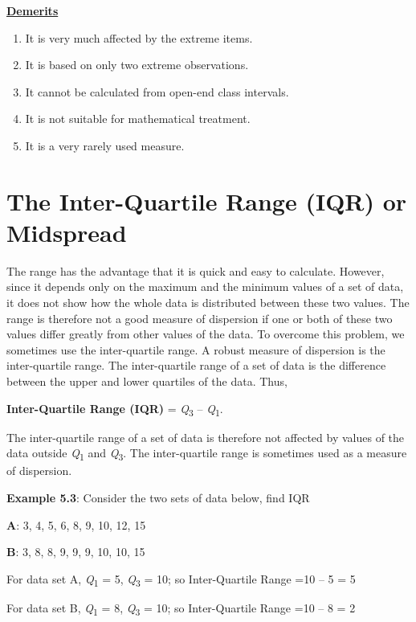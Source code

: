 \documentclass[
]{book}
\begin{document}
\textbf{\underline{Demerits}}

\begin{enumerate}
\def\labelenumi{\arabic{enumi}.}
\item
  It is very much affected by the extreme items.
\item
  It is based on only two extreme observations.
\item
  It cannot be calculated from open-end class intervals.
\item
  It is not suitable for mathematical treatment.
\item
  It is a very rarely used measure.
\end{enumerate}

\hypertarget{the-inter-quartile-range-iqr-or-midspread}{%
\section{The Inter-Quartile Range (IQR) or Midspread}\label{the-inter-quartile-range-iqr-or-midspread}}

The range has the advantage that it is quick and easy to calculate.
However, since it depends only on the maximum and the minimum values of
a set of data, it does not show how the whole data is distributed
between these two values. The range is therefore not a good measure of
dispersion if one or both of these two values differ greatly from other
values of the data. To overcome this problem, we sometimes use the
inter-quartile range. A robust measure of dispersion is the
inter-quartile range. The inter-quartile range of a set of data is the
difference between the upper and lower quartiles of the data. Thus,

\textbf{Inter-Quartile Range (IQR)} = \emph{Q}\textsubscript{3} -- \emph{Q}\textsubscript{1}.

The inter-quartile range of a set of data is therefore not affected by
values of the data outside \emph{Q}\textsubscript{1} and \emph{Q}\textsubscript{3}. The inter-quartile range
is sometimes used as a measure of dispersion.

\textbf{Example 5.3}: Consider the two sets of data below, find IQR

\textbf{A}: 3, 4, 5, 6, 8, 9, 10, 12, 15

\textbf{B}: 3, 8, 8, 9, 9, 9, 10, 10, 15

For data set A, \emph{Q}\textsubscript{1} = 5, \emph{Q}\textsubscript{3} = 10; so Inter-Quartile Range =10 --
5 = 5

For data set B, \emph{Q}\textsubscript{1} = 8, \emph{Q}\textsubscript{3} = 10; so Inter-Quartile Range =10 --
8 = 2
\end{document}
